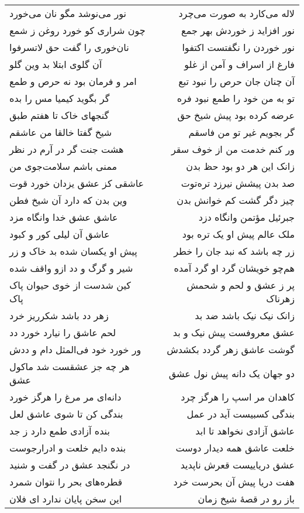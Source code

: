 \begin{center}
\begin{longtable}{l p{0.5cm} r}
نور می‌نوشد مگو نان می‌خورد
&&
لاله می‌کارد به صورت می‌چرد
\\
چون شراری کو خورد روغن ز شمع
&&
نور افزاید ز خوردش بهر جمع
\\
نان‌خوری را گفت حق لاتسرفوا
&&
نور خوردن را نگفتست اکتفوا
\\
آن گلوی ابتلا بد وین گلو
&&
فارغ از اسراف و آمن از غلو
\\
امر و فرمان بود نه حرص و طمع
&&
آن چنان جان حرص را نبود تبع
\\
گر بگوید کیمیا مس را بده
&&
تو به من خود را طمع نبود فره
\\
گنجهای خاک تا هفتم طبق
&&
عرضه کرده بود پیش شیخ حق
\\
شیخ گفتا خالقا من عاشقم
&&
گر بجویم غیر تو من فاسقم
\\
هشت جنت گر در آرم در نظر
&&
ور کنم خدمت من از خوف سقر
\\
ممنی باشم سلامت‌جوی من
&&
زانک این هر دو بود حظ بدن
\\
عاشقی کز عشق یزدان خورد قوت
&&
صد بدن پیشش نیرزد تره‌توت
\\
وین بدن که دارد آن شیخ فطن
&&
چیز دگر گشت کم خوانش بدن
\\
عاشق عشق خدا وانگاه مزد
&&
جبرئیل مؤتمن وانگاه دزد
\\
عاشق آن لیلی کور و کبود
&&
ملک عالم پیش او یک تره بود
\\
پیش او یکسان شده بد خاک و زر
&&
زر چه باشد که نبد جان را خطر
\\
شیر و گرگ و دد ازو واقف شده
&&
هم‌چو خویشان گرد او گرد آمده
\\
کین شدست از خوی حیوان پاک پاک
&&
پر ز عشق و لحم و شحمش زهرناک
\\
زهر دد باشد شکرریز خرد
&&
زانک نیک نیک باشد ضد بد
\\
لحم عاشق را نیارد خورد دد
&&
عشق معروفست پیش نیک و بد
\\
ور خورد خود فی‌المثل دام و ددش
&&
گوشت عاشق زهر گردد بکشدش
\\
هر چه جز عشقست شد ماکول عشق
&&
دو جهان یک دانه پیش نول عشق
\\
دانه‌ای مر مرغ را هرگز خورد
&&
کاهدان مر اسپ را هرگز چرد
\\
بندگی کن تا شوی عاشق لعل
&&
بندگی کسبیست آید در عمل
\\
بنده آزادی طمع دارد ز جد
&&
عاشق آزادی نخواهد تا ابد
\\
بنده دایم خلعت و ادرارجوست
&&
خلعت عاشق همه دیدار دوست
\\
در نگنجد عشق در گفت و شنید
&&
عشق دریاییست قعرش ناپدید
\\
قطره‌های بحر را نتوان شمرد
&&
هفت دریا پیش آن بحرست خرد
\\
این سخن پایان ندارد ای فلان
&&
باز رو در قصهٔ شیخ زمان
\\
\end{longtable}
\end{center}
